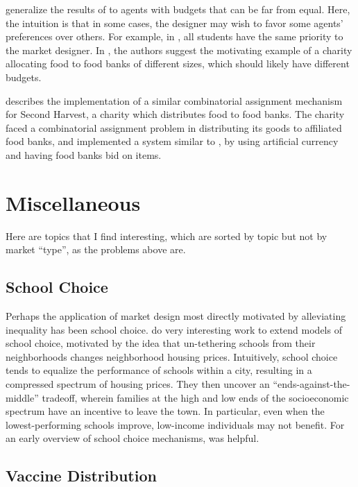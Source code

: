 \documentclass[JEL]{AEA}
\begin{document}
\cite{babaioff-2019} generalize the results of \cite{budish-2011} to agents with budgets that can be far from equal. Here, the intuition is that in some cases, the designer may wish to favor some agents' preferences over others. For example, in \cite{budish-2011}, all students have the same priority to the market designer. In \cite{babaioff-2019}, the authors suggest the motivating example of a charity allocating food to food banks of different sizes, which should likely have different budgets.

\cite{prendergast-2017} describes the implementation of a similar combinatorial assignment mechanism for Second Harvest, a charity which distributes food to food banks. The charity faced a combinatorial assignment problem in distributing its goods to affiliated food banks, and implemented a system similar to \cite{budish-2011}, by using artificial currency and having food banks bid on items.

\section{Miscellaneous}

Here are topics that I find interesting, which are sorted by topic but not by market ``type'', as the problems above are.

\subsection{School Choice}

Perhaps the application of market design most directly motivated by alleviating inequality has been school choice. \cite{avery-2020} do very interesting work to extend models of school choice, motivated by the idea that un-tethering schools from their neighborhoods changes neighborhood housing prices. Intuitively, school choice tends to equalize the performance of schools within a city, resulting in a compressed spectrum of housing prices. They then uncover an ``ends-against-the-middle'' tradeoff, wherein families at the high and low ends of the socioeconomic spectrum have an incentive to leave the town. In particular, even when the lowest-performing schools improve, low-income individuals may not benefit. For an early overview of school choice mechanisms, \cite{pathak-2011} was helpful.

\subsection{Vaccine Distribution}
\end{document}
